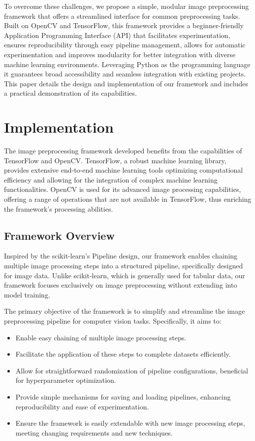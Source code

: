 \documentclass[journal]{new-aiaa}
\begin{document}
To overcome these challenges, we propose a simple, modular image preprocessing framework that offers a streamlined interface for common preprocessing tasks.  Built on OpenCV and TensorFlow, this framework provides a beginner-friendly Application Programming Interface (API) that facilitates experimentation, ensures reproducibility through easy pipeline management, allows for automatic experimentation and improves modularity for better integration with diverse machine learning environments. Leveraging Python as the programming language it guarantees broad accessibility and seamless integration with existing projects.\cite{python}\cite{pythonCV} This paper details the design and implementation of our framework and includes a practical demonstration of its capabilities.


\section{Implementation}
The image preprocessing framework developed benefits from the capabilities of TensorFlow and OpenCV. TensorFlow, a robust machine learning library, provides extensive end-to-end machine learning tools optimizing computational efficiency and allowing for the integration of complex machine learning functionalities.\cite{tensorflowLearn} OpenCV is used for its advanced image processing capabilities, offering a range of operations that are not available in TensorFlow, thus enriching the framework's processing abilities.\cite{opencvTutorial}


\subsection{Framework Overview}
Inspired by the scikit-learn's Pipeline design, our framework enables chaining multiple image processing steps into a structured pipeline, specifically designed for image data.\cite{pedregosa2011scikit} Unlike scikit-learn, which is generally used for tabular data, our framework focuses exclusively on image preprocessing without extending into model training.

The primary objective of the framework is to simplify and streamline the image preprocessing pipeline for computer vision tasks. Specifically, it aims to:
\begin{itemize}
	\item Enable easy chaining of multiple image processing steps.
	\item Facilitate the application of these steps to complete datasets efficiently.
	\item Allow for straightforward randomization of pipeline configurations, beneficial for hyperparameter optimization.
	\item Provide simple mechanisms for saving and loading pipelines, enhancing reproducibility and ease of experimentation.
	\item Ensure the framework is easily extendable with new image processing steps, meeting changing requirements and new techniques.
\end{itemize}
\end{document}
